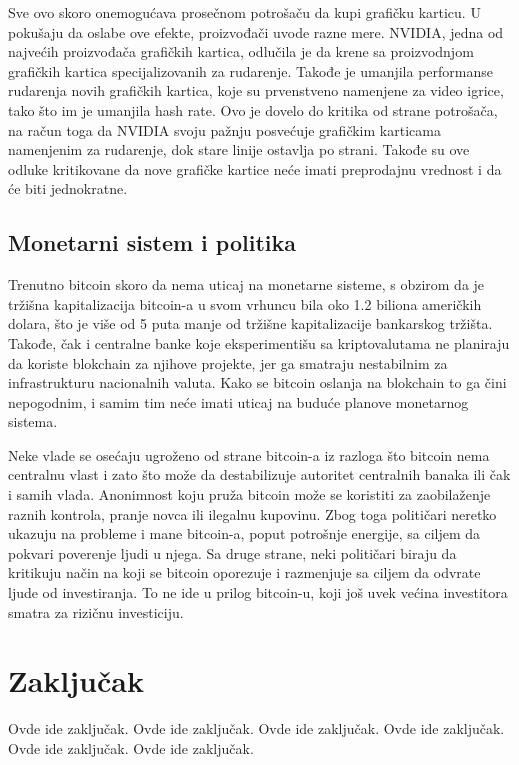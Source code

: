 \documentclass[a4paper]{article}
\begin{document}
Sve ovo skoro onemogućava prosečnom potrošaču da kupi grafičku karticu. U pokušaju da oslabe ove efekte, proizvođači uvode razne mere. NVIDIA, jedna od najvećih proizvođača grafičkih kartica, odlučila je da krene sa proizvodnjom grafičkih kartica specijalizovanih za rudarenje. Takođe je umanjila performanse rudarenja novih grafičkih kartica, koje su prvenstveno namenjene za video igrice, tako što im je umanjila hash rate. Ovo je dovelo do kritika od strane potrošača, na račun toga da NVIDIA svoju pažnju posvećuje grafičkim karticama namenjenim za rudarenje, dok stare linije ostavlja po strani. Takođe su ove odluke kritikovane da nove grafičke kartice neće imati preprodajnu vrednost i da će biti jednokratne.

\subsection{Monetarni sistem i politika}

Trenutno bitcoin skoro da nema uticaj na monetarne sisteme, s obzirom da je tržišna kapitalizacija bitcoin-a u svom vrhuncu bila oko 1.2 biliona američkih dolara, što je više od 5 puta manje od tržišne kapitalizacije bankarskog tržišta. Takođe, čak i centralne banke koje eksperimentišu sa kriptovalutama ne planiraju da koriste blokchain za njihove projekte, jer ga smatraju nestabilnim za infrastrukturu nacionalnih valuta. Kako se bitcoin oslanja na blokchain to ga čini nepogodnim, i samim tim neće imati uticaj na buduće planove monetarnog sistema.

Neke vlade se osećaju ugroženo od strane bitcoin-a iz razloga što bitcoin nema centralnu vlast i zato što može da destabilizuje autoritet centralnih banaka ili čak i samih vlada. Anonimnost koju pruža bitcoin može se koristiti za zaobilaženje raznih kontrola, pranje novca ili ilegalnu kupovinu. Zbog toga političari neretko ukazuju na probleme i mane bitcoin-a, poput potrošnje energije, sa ciljem da pokvari poverenje ljudi u njega. Sa druge strane, neki političari biraju da kritikuju način na koji se bitcoin oporezuje i razmenjuje sa ciljem da odvrate ljude od investiranja. To ne ide u prilog bitcoin-u, koji još uvek većina investitora smatra za rizičnu investiciju.

\clearpage

\section{Zaključak}

Ovde ide zaključak.
Ovde ide zaključak.
Ovde ide zaključak.
Ovde ide zaključak.
Ovde ide zaključak.
Ovde ide zaključak.
\end{document}
